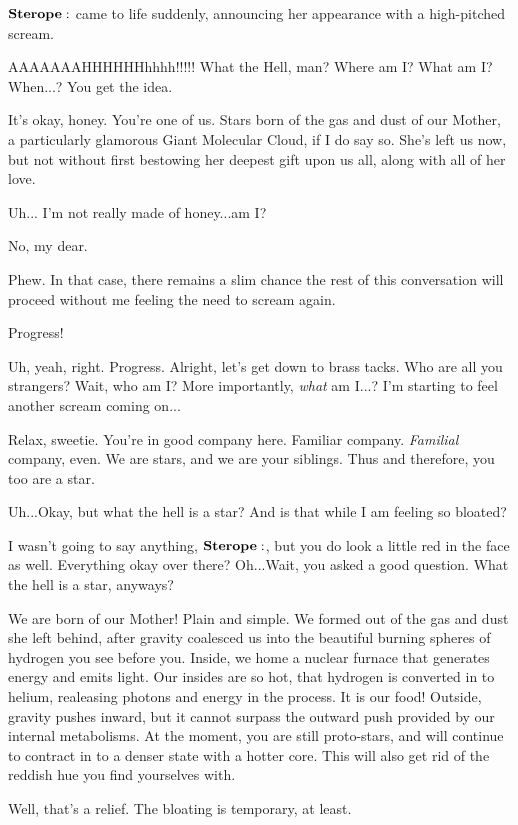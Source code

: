 $\Sterope$ came to life suddenly, announcing her appearance with a high-pitched scream.

\Sterope AAAAAAAHHHHHHhhhh!!!!!  What the Hell, man?  Where am I?  What am I?  When...?  You get the idea.

\Maia It's okay, honey.  You're one of us.  Stars born of the gas and dust of our Mother, a particularly glamorous Giant Molecular Cloud, if I do say so.  She's left us now, but not without first bestowing her deepest gift upon us all, along with all of her love.

\Sterope  Uh... I'm not really made of honey...am I?  

\Maia No, my dear.

\Sterope  Phew.  In that case, there remains a slim chance the rest of this conversation will proceed without me feeling the need to scream again.

\Maia Progress!

\Sterope Uh, yeah, right.  Progress.  Alright, let's get down to brass tacks.  Who are all you strangers?  Wait, who am I?  More importantly, \textit{what} am I...?  I'm starting to feel another scream coming on...

\Maia Relax, sweetie.  You're in good company here.  Familiar company.  \textit{Familial} company, even. We are stars, and we are your siblings.  Thus and therefore, you too are a star.  

\Sterope Uh...Okay, but what the hell is a star?  And is that while I am feeling so bloated?

\Alcyone I wasn't going to say anything, $\Sterope$, but you do look a little red in the face as well.  Everything okay over there?  Oh...Wait, you asked a good question.  What the hell is a star, anyways?

\Maia We are born of our Mother!  Plain and simple.  We formed out of the gas and dust she left behind, after gravity coalesced us into the beautiful burning spheres of hydrogen you see before you.  Inside, we home a nuclear furnace that generates energy and emits light.  Our insides are so hot, that hydrogen is converted in to helium, realeasing photons and energy in the process.  It is our food!  Outside, gravity pushes inward, but it cannot surpass the outward push provided by our internal metabolisms.  At the moment, you are still proto-stars, and will continue to contract in to a denser state with a hotter core.  This will also get rid of the reddish hue you find yourselves with.

\Sterope Well, that's a relief.  The bloating is temporary, at least.

